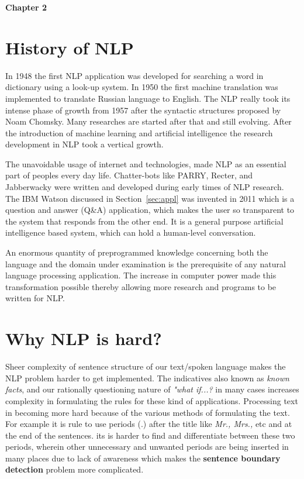 \documentclass{bmcart}
\begin{document}
\newpage
\begin{center}
\huge {\bf Chapter 2}
\end{center}

\section{History of NLP}
\label{sec:history}
In 1948  the first NLP application was developed for searching a word in dictionary using a look-up system. In 1950 the first machine translation was implemented to translate Russian language to English. The NLP really took its intense phase of growth from 1957 after the syntactic structures proposed by Noam Chomsky. Many researches are started after that and still evolving. After the introduction of machine learning and artificial intelligence the research development in NLP took a vertical growth.

The unavoidable usage of internet and technologies, made NLP as an essential part of peoples every day life. Chatter-bots like PARRY, Recter, and Jabberwacky were written and developed during early times of NLP research. The IBM Watson discussed in Section~\ref{sec:appl} was invented in 2011 which is a question and answer (Q\&A) application, which makes the user so transparent to the system that responds from the other end. It is a general purpose artificial intelligence based system, which can hold a human-level conversation. 

An enormous quantity of preprogrammed knowledge concerning both the language and the domain under examination is the prerequisite of any natural language processing application. 
The increase in computer power made this transformation possible thereby allowing more research and programs to be written for NLP.

\section{Why NLP is hard?}
\label{sec:hardNLP}

Sheer complexity of sentence structure of our text/spoken language makes the NLP problem harder to get implemented. The indicatives also known as \textit{known facts}, and our rationally questioning nature of \textit{"what if...?} in many cases increases complexity in formulating the rules for these kind of applications. Processing text in becoming more hard because of the various methods of formulating the text. For example it is rule to use periods (.) after the title like \textit{Mr., Mrs.,} etc and at the end of the sentences. its is harder to find and differentiate between these two periods, wherein other unnecessary and unwanted periods are being inserted in many places due to lack of awareness which makes the \textbf{sentence boundary detection} problem more complicated. 
\end{document}
